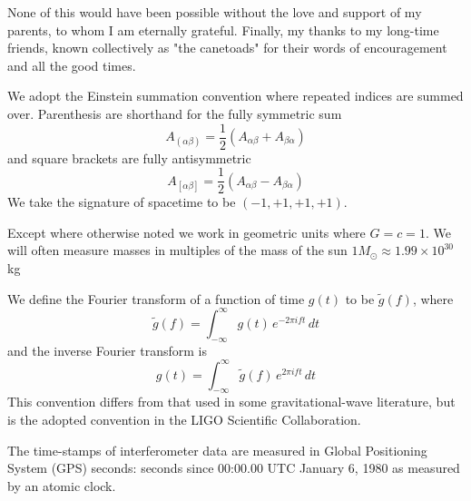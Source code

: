 \documentclass[12pt,notitlepage]{report}
\newcommand{\msun}{M_\odot}
\begin{document}
None of this would have been possible without the love and support of
my parents, to whom I am eternally grateful.  Finally, my thanks to my
long-time friends, known collectively as "the canetoads" for their
words of encouragement and all the good times.



We adopt the Einstein summation convention where repeated indices are
summed over.  Parenthesis are shorthand for the fully symmetric sum
%
\begin{equation*}
A_{(\alpha\beta)}
= \frac{1}{2} \left(A_{\alpha\beta} 
+ A_{\beta\alpha} \right)
\end{equation*}
%
and square brackets are fully antisymmetric
%
\begin{equation*}
A_{[\alpha\beta]}
= \frac{1}{2} \left(A_{\alpha\beta} 
- A_{\beta\alpha} \right)
\end{equation*}
%
We take the signature of spacetime to be $(-1,+1,+1,+1)$.

\noindent Except where otherwise noted we work in geometric units where
$G=c=1$.  We will often measure masses in multiples of the mass of the
sun $1 \msun \approx 1.99 \times 10^{30}$ kg 

\vspace{0.5cm}

\noindent We define the Fourier transform of a function of time $g(t)$ to be
$\tilde{g}(f)$, where
%
\begin{equation*}
\tilde{g}(f)=\int_{-\infty}^\infty g(t)\, e^{- 2 \pi i f t}\, dt
\end{equation*}
%
and the inverse Fourier transform is
%
\begin{equation*}
g(t)=\int_{-\infty}^\infty \tilde{g}(f)\, e^{2 \pi i f t}\, dt
\end{equation*}
%
This convention differs from that used in some gravitational-wave
literature, but is the adopted convention in the LIGO Scientific
Collaboration.

\vspace{0.5cm}

\noindent The time-stamps of interferometer data are measured in
Global Positioning System (GPS) seconds: seconds since 00:00.00 UTC
January 6, 1980 as measured by an atomic clock.



\label{ch:introduction}


\label{ch:theory}
	
\end{document}
